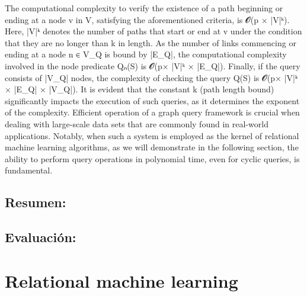 \documentclass{article}%
\begin{document}
\newline%
The computational complexity to verify the existence of a path beginning or ending at a node v in V, satisfying the aforementioned criteria, is 𝓞(p × |V|ᵏ). Here, |V|ᵏ denotes the number of paths that start or end at v under the condition that they are no longer than k in length. As the number of links commencing or ending at a node n ∈ V\_Q is bound by |E\_Q|, the computational complexity involved in the node predicate Qₙ(S) is 𝓞(p× |V|ᵏ × |E\_Q|).\newline%
\newline%
Finally, if the query consists of |V\_Q| nodes, the complexity of checking the query Q(S) is 𝓞(p× |V|ᵏ × |E\_Q| × |V\_Q|). It is evident that the constant k (path length bound) significantly impacts the execution of such queries, as it determines the exponent of the complexity.\newline%
\newline%
Efficient operation of a graph query framework is crucial when dealing with large{-}scale data sets that are commonly found in real{-}world applications. Notably, when such a system is employed as the kernel of relational machine learning algorithms, as we will demonstrate in the following section, the ability to perform query operations in polynomial time, even for cyclic queries, is fundamental.

%
\subsection{Resumen:}%
\label{subsec:Resumen}%

%
\subsection{Evaluación:}%
\label{subsec:Evaluacin}%

%
\clearpage%
\section{Relational machine learning}%
\label{sec:Relationalmachinelearning}%
\end{document}
